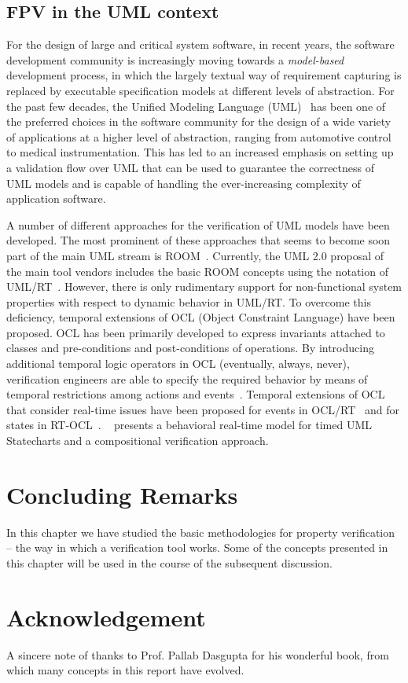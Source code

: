 \subsection{FPV in the UML context} \label{sec2.5.2}
For the design of large and critical system software, in recent years, the 
software development community is increasingly moving towards a {\em 
model-based} development process, in which the largely textual way of 
requirement capturing is replaced by executable specification models at
different levels of abstraction. For the past few decades,
the Unified Modeling Language (UML)~\cite{uml} has been one of the
preferred choices in the software community for the
design of a wide variety of applications at a higher level of abstraction,
ranging from automotive control to medical instrumentation.
This has led to an increased emphasis
on setting up a validation flow over UML that can be used to guarantee the
correctness of UML models and is capable of handling the ever-increasing
complexity of application software.

\noindent
A number of different approaches for the verification of UML models 
have been developed. The most prominent of these approaches that seems to
become soon part of the main UML stream is ROOM~\cite{room}. Currently,
the UML 2.0 proposal of the main tool vendors includes the basic ROOM
concepts using the notation of UML/RT~\cite{umlrt}. However, there is only
rudimentary support for non-functional system properties with respect to
dynamic behavior in UML/RT. To overcome this deficiency, temporal extensions
of OCL (Object Constraint Language) have been proposed. OCL has been primarily
developed to express invariants attached to classes and pre-conditions and
post-conditions of operations. By introducing additional temporal logic
operators in OCL (eventually, always, never), verification engineers
are able to specify the
required behavior by means of temporal restrictions among actions and
events~\cite{tocl}. Temporal extensions of OCL that consider real-time issues
have been proposed for events in OCL/RT~\cite{oclrt} and for states in
RT-OCL~\cite{rtocl}. ~\cite{giese} presents a behavioral real-time
model for timed UML Statecharts and a compositional verification approach.

\section{Concluding Remarks} \label{sec2.6}
In this chapter we have studied the basic methodologies for property
verification -- the way in which a verification tool works.
Some of the concepts presented in this 
chapter will be used in the course of the subsequent discussion.

\section{Acknowledgement}
A sincere note of thanks to Prof. Pallab Dasgupta for his wonderful book, from which 
many concepts in this report have evolved.
